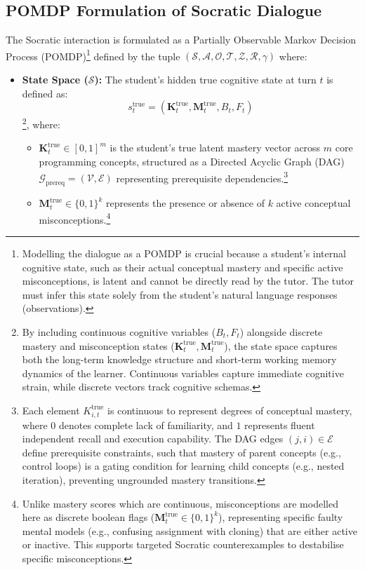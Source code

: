 \subsection{POMDP Formulation of Socratic Dialogue}
The Socratic interaction is formulated as a Partially Observable Markov Decision Process (POMDP)\footnote{Modelling the dialogue as a POMDP is crucial because a student's internal cognitive state, such as their actual conceptual mastery and specific active misconceptions, is latent and cannot be directly read by the tutor. The tutor must infer this state solely from the student's natural language responses (observations).} defined by the tuple $(\mathcal{S}, \mathcal{A}, \mathcal{O}, \mathcal{T}, \mathcal{Z}, \mathcal{R}, \gamma)$ where:
\begin{itemize}
    \item \textbf{State Space ($\mathcal{S}$):} The student's hidden true cognitive state at turn $t$ is defined as:
    \begin{equation}
        s_t^{\text{true}} = \left(\mathbf{K}_t^{\text{true}}, \mathbf{M}_t^{\text{true}}, B_t, F_t\right)
    \end{equation}\footnote{By including continuous cognitive variables ($B_t, F_t$) alongside discrete mastery and misconception states ($\mathbf{K}_t^{\text{true}}, \mathbf{M}_t^{\text{true}}$), the state space captures both the long-term knowledge structure and short-term working memory dynamics of the learner. Continuous variables capture immediate cognitive strain, while discrete vectors track cognitive schemas.}, where:
    \begin{itemize}
        \item $\mathbf{K}_t^{\text{true}} \in [0, 1]^m$ is the student's true latent mastery vector across $m$ core programming concepts, structured as a Directed Acyclic Graph (DAG) $\mathcal{G}_{\text{prereq}} = (\mathcal{V}, \mathcal{E})$ representing prerequisite dependencies.\footnote{Each element $K^{\text{true}}_{i, t}$ is continuous to represent degrees of conceptual mastery, where $0$ denotes complete lack of familiarity, and $1$ represents fluent independent recall and execution capability. The DAG edges $(j, i) \in \mathcal{E}$ define prerequisite constraints, such that mastery of parent concepts (e.g., control loops) is a gating condition for learning child concepts (e.g., nested iteration), preventing ungrounded mastery transitions.}
        \item $\mathbf{M}_t^{\text{true}} \in \{0, 1\}^k$ represents the presence or absence of $k$ active conceptual misconceptions.\footnote{Unlike mastery scores which are continuous, misconceptions are modelled here as discrete boolean flags ($\mathbf{M}_t^{\text{true}} \in \{0, 1\}^k$), representing specific faulty mental models (e.g., confusing assignment with cloning) that are either active or inactive. This supports targeted Socratic counterexamples to destabilise specific misconceptions.}

\end{itemize}
\end{itemize}
